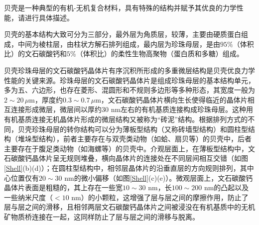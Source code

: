 \documentclass{assignment}
\begin{document}
\begin{ti}
    贝壳是一种典型的有机-无机复合材料，具有特殊的结构并赋予其优良的力学性能，请进行具体描述。
\end{ti}
\begin{da}
    贝壳的基本结构大致可分为三部分，最外层为角质层，较薄，主要由硬质蛋白组成，中间为棱柱层，由柱状方解石排列组成，最内层为珍珠母层，是由$95\%$（体积比）的文石碳酸钙和$5\%$（体积比）的柔性生物高聚物（蛋白质和多糖）组成\cite{Zhao2017Preparation-and-application-of-shell-like-mother-of-pearl-layered-composite-material}\cite{Huang2008Research-on-Biomimetic-Composites-with-Shell-Nacre-Structure}\cite{Zhang2006Biomineralization-of-shell-nacre-and-its-enlightenment-to-biomimetic-materials}。

    贝壳珍珠母层的文石碳酸钙晶体片有序沉积所形成的多重微层结构是贝壳优良力学性能的关键来源。珍珠母层的文石碳酸钙晶体片是组成珍珠母层的基本结构单元，多为五、六边形，也存在菱形、混圆形和不规则多边形等多种形态，其宽度一般为$2\sim 20\,\mu$m，厚度约$0.3\sim 0.7\,\mu$m，文石碳酸钙晶体片横向生长使得临近的晶体片相互连接形成微层，微层间以厚约$30$ nm左右的有机基质连接构成珍珠母层\cite{Zhang2006Biomineralization-of-shell-nacre-and-its-enlightenment-to-biomimetic-materials}。这种用有机基质连接无机晶体片形成的微层结构又被称为“砖泥”结构。根据排列方式的不同，贝壳珍珠母层的转你结构可以分为薄板型结构（又称砖墙型结构）和圆柱型结构（堆垛型结构），前者主要存在与双壳类动物（如蛤、扇贝等）的贝壳中，后者主要存在于腹足类动物（如海螺等）的贝壳中\cite{Zhao2017Preparation-and-application-of-shell-like-mother-of-pearl-layered-composite-material}。介观层面上，在薄板型结构中，文石碳酸钙晶体片呈无规则堆叠，横向晶体片的连接处在不同层间相互交错（如图\ref{Shell}(b)(d)）；在圆柱型结构中，相邻层晶体片的沿垂直层的方向规则排列，其中心位置仅有$20\sim 30$ nm的微小偏移（如图\ref{Shell}(c)(e)）\cite{Zhang2006Biomineralization-of-shell-nacre-and-its-enlightenment-to-biomimetic-materials}。微观层面上，文石碳酸钙晶体片表面是粗糙的，其上存在一些宽$10\sim 30$ nm，长$100\sim 200$ nm的凸起以及一些纳米尺度（$<10$ nm）的小颗粒，这增强了层与层之间的摩擦作用，防止了层与层之间的滑移，且相邻两层文石碳酸钙晶体片之间被浸没在有机基质中的无机矿物质桥连接在一起，这同样防止了层与层之间的滑移与脱离\cite{Zhao2017Preparation-and-application-of-shell-like-mother-of-pearl-layered-composite-material}。


\end{da}
\end{document}

